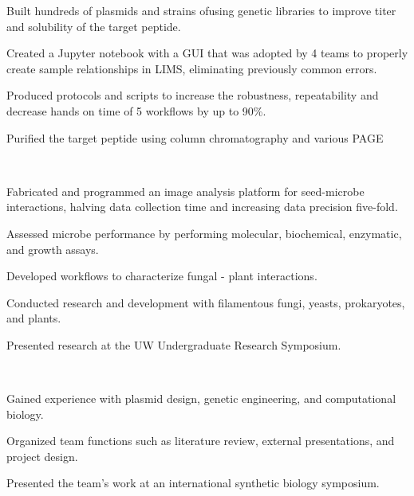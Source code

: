 \documentclass[]{forrest-resume-interfont}
\begin{document}
\begin{tightemize}
    \item Built hundreds of plasmids and strains ofusing genetic libraries to improve titer and solubility of the target peptide. \vspace{-3pt}
    \item Created a Jupyter notebook with a GUI that was adopted by 4 teams to properly create sample relationships in LIMS, eliminating previously common errors.
    \item Produced protocols and scripts to increase the robustness, repeatability and decrease hands on time of 5 workflows by up to 90\%.
    \item Purified the target peptide using column chromatography and various PAGE 
\end{tightemize}

\spacesep

\\

\begin{tightemize}
    \item Fabricated and programmed an image analysis platform for seed-microbe interactions, halving data collection time and increasing data precision five-fold.
    \item Assessed microbe performance by performing molecular, biochemical, enzymatic, and growth assays.
   \item Developed workflows to characterize fungal - plant interactions.
   \item Conducted research and development with filamentous fungi, yeasts, prokaryotes, and plants.
    \item Presented research at the UW Undergraduate Research Symposium.
\end{tightemize}

\spacesep

\\

\begin{tightemize}
    \item Gained experience with plasmid design, genetic engineering, and computational biology.
    \item Organized team functions such as literature review, external presentations, and project design.
    \item Presented the team's work at an international synthetic biology symposium.
\end{tightemize}
\end{document}

